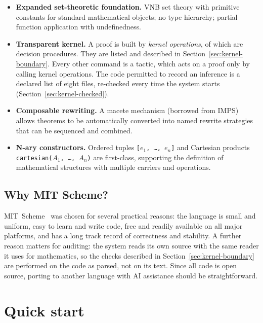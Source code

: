 \begin{itemize}
\item \textbf{Expanded set-theoretic foundation.}  VNB set theory with
  primitive constants for standard mathematical objects; no type
  hierarchy; partial function application with undefinedness.
\item \textbf{Transparent kernel.}  A proof is built by
  \VNBkernelopcount{} \emph{kernel operations}, of which
  \VNBkernelopcountoracle{} are decision procedures.  They are listed and
  described in Section~\ref{sec:kernel-boundary}.  Every other command is a
  tactic, which acts on a proof only by calling kernel operations.  The
  code permitted to record an inference is a declared list of eight files,
  re-checked every time the system starts
  (Section~\ref{sec:kernel-checked}).
\item \textbf{Composable rewriting.}  A macete mechanism (borrowed from
  IMPS) allows theorems to be automatically converted into named rewrite
  strategies that can be sequenced and combined.
\item \textbf{N-ary constructors.}  Ordered tuples \texttt{[$e_1$,
  \ldots, $e_n$]} and Cartesian products \texttt{cartesian($A_1$, \ldots,
  $A_n$)} are first-class, supporting the definition of mathematical
  structures with multiple carriers and operations.
\end{itemize}

\subsection{Why MIT Scheme?}

MIT~Scheme~\cite{MITScheme} was chosen for several practical reasons: the language is
small and uniform, easy to learn and write code, free and readily
available on all major platforms, and has a long track record of
correctness and stability.  A further reason matters for auditing: the
system reads its own source with the same reader it uses for
mathematics, so the checks described in
Section~\ref{sec:kernel-boundary} are performed on the code as parsed,
not on its text.  Since all code is
open source, porting to another language with AI assistance should be
straightforward.


\section{Quick start}
\label{sec:quickstart-chap}

